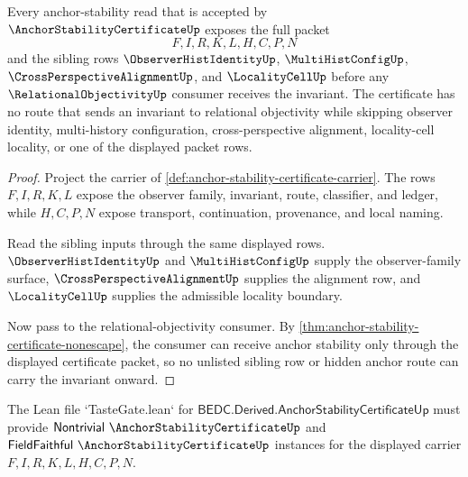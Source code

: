\begin{theorem}
\label{thm:anchor-stability-certificate-route-exhaustion}
Every anchor-stability read that is accepted by $\AnchorStabilityCertificateUp$ exposes the full packet
$$
F,I,R,K,L,H,C,P,N
$$
and the sibling rows $\ObserverHistIdentityUp$, $\MultiHistConfigUp$, $\CrossPerspectiveAlignmentUp$, and $\LocalityCellUp$ before any $\RelationalObjectivityUp$ consumer receives the invariant. The certificate has no route that sends an invariant to relational objectivity while skipping observer identity, multi-history configuration, cross-perspective alignment, locality-cell locality, or one of the displayed packet rows.
\end{theorem}
\begin{proof}
Project the carrier of \autoref{def:anchor-stability-certificate-carrier}. The rows $F,I,R,K,L$ expose the observer family, invariant, route, classifier, and ledger, while $H,C,P,N$ expose transport, continuation, provenance, and local naming.

Read the sibling inputs through the same displayed rows. $\ObserverHistIdentityUp$ and $\MultiHistConfigUp$ supply the observer-family surface, $\CrossPerspectiveAlignmentUp$ supplies the alignment row, and $\LocalityCellUp$ supplies the admissible locality boundary.

Now pass to the relational-objectivity consumer. By \autoref{thm:anchor-stability-certificate-nonescape}, the consumer can receive anchor stability only through the displayed certificate packet, so no unlisted sibling row or hidden anchor route can carry the invariant onward.
\end{proof}



The Lean file `TasteGate.lean` for $\mathsf{BEDC.Derived.AnchorStabilityCertificateUp}$ must provide $\mathsf{Nontrivial}\ \AnchorStabilityCertificateUp$ and $\mathsf{FieldFaithful}\ \AnchorStabilityCertificateUp$ instances for the displayed carrier $F,I,R,K,L,H,C,P,N$.


